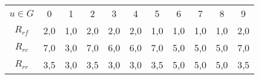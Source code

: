 \begin{tabular}{c|c|c|c|c|c|c|c|c|c|c|}
	\cline{2-11}
	$u \in G$ & 0 & 1 & 2 & 3 & 4 & 5 & 6 & 7 & 8 & 9 \\
	\cline{2-11}
	$R_{rf}$ & 2,0 & 1,0 & 2,0 & 2,0 & 2,0 & 1,0 & 1,0 & 1,0 & 1,0 & 2,0 \\
	\cline{2-11}
	$R_{rc}$ & 7,0 & 3,0 & 7,0 & 6,0 & 6,0 & 7,0 & 5,0 & 5,0 & 5,0 & 7,0 \\
	\cline{2-11}
	$R_{rr}$ & 3,5 & 3,0 & 3,5 & 3,0 & 3,0 & 3,5 & 5,0 & 5,0 & 5,0 & 3,5 \\
    \cline{2-11}
\end{tabular}
